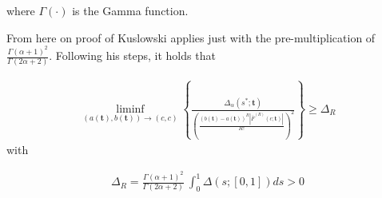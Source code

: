 \documentclass{article}
\begin{document}
where $\Gamma(\cdot)$ is the Gamma function.
 
 From here on proof of Kuslowski applies just with the pre-multiplication of $\frac{\Gamma (\alpha + 1)^2}{\Gamma (2\alpha + 2)}$. Following his steps, it holds that 
 
 \begin{align}
     \liminf_{(a(\mathbf{t}), b(\mathbf{t})) \rightarrow (c, c)} \left \{  \frac{\Delta_{\alpha}(s^*; \mathbf{t})}{ \left (\frac{(b(\mathbf{t}) - a(\mathbf{t}))^R |\bar{F}^{(R)}(c; \mathbf{t})|}{R!} \right )^2} \right \} \geq \Delta_R
 \end{align}
 with
 
 \begin{align*}
     \Delta_R = \frac{\Gamma (\alpha + 1)^2}{\Gamma (2\alpha + 2)} \  \int_0^1 \Delta(s; [0, 1])ds > 0
 \end{align*}
\end{document}
